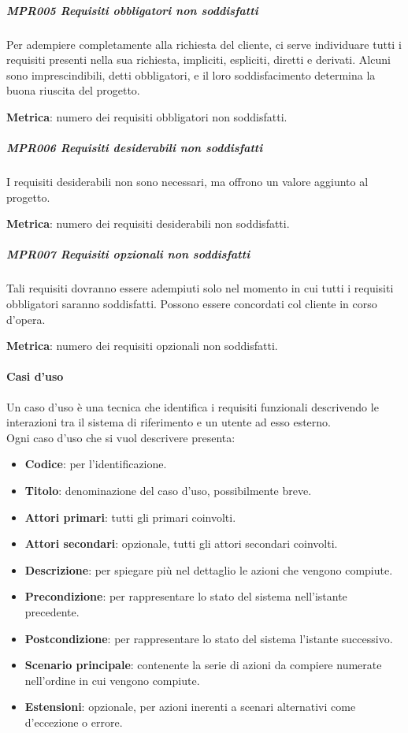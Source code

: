 		\subparagraph{MPR005 Requisiti obbligatori non soddisfatti}
		Per adempiere completamente alla richiesta del cliente, ci serve individuare tutti i requisiti presenti nella sua richiesta, impliciti, espliciti, diretti e derivati. Alcuni sono imprescindibili, detti obbligatori, e il loro soddisfacimento determina la buona riuscita del progetto.
		
		\textbf{Metrica}: numero dei requisiti obbligatori non soddisfatti.
		
		\subparagraph{MPR006 Requisiti desiderabili non soddisfatti}
		I requisiti desiderabili non sono necessari, ma offrono un valore aggiunto al progetto.
		
		\textbf{Metrica}: numero dei requisiti desiderabili non soddisfatti.
		
		\subparagraph{MPR007 Requisiti opzionali non soddisfatti}
		Tali requisiti dovranno essere adempiuti solo nel momento in cui tutti i requisiti obbligatori saranno soddisfatti.
		Possono essere concordati col cliente in corso d'opera.
		
		\textbf{Metrica}: numero dei requisiti opzionali non soddisfatti.
	

		\paragraph{Casi d'uso}\label{PP:Sviluppo:AdR:CasiUso}
		Un caso d'uso è una tecnica che identifica i requisiti funzionali descrivendo le interazioni tra il sistema di riferimento e un utente ad esso esterno.\\
		Ogni caso d'uso che si vuol descrivere presenta:
		\begin{itemize}
		 	\item \textbf{Codice}: per l'identificazione.
		 	\item \textbf{Titolo}: denominazione del caso d'uso, possibilmente breve.
		 	\item \textbf{Attori primari}: tutti gli  primari coinvolti.
		 	\item \textbf{Attori secondari}: opzionale, tutti gli attori secondari coinvolti.
		 	\item \textbf{Descrizione}: per spiegare più nel dettaglio le azioni che vengono compiute.
		 	\item \textbf{Precondizione}: per rappresentare lo stato del sistema nell'istante precedente.
		 	\item \textbf{Postcondizione}: per rappresentare lo stato del sistema l'istante successivo.
		 	\item \textbf{Scenario principale}: contenente la serie di azioni da compiere numerate nell'ordine in cui vengono compiute.
		 	\item \textbf{Estensioni}: opzionale, per azioni inerenti a scenari alternativi come d'eccezione o errore.
		\end{itemize}
	
